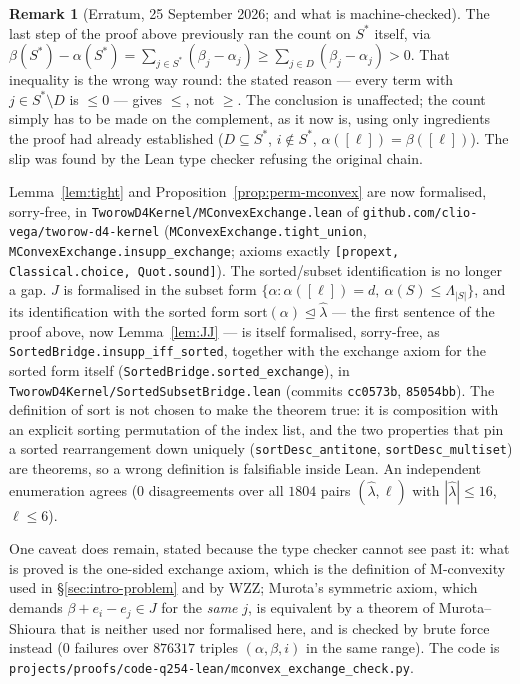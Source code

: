 \documentclass[11pt]{article}
\theoremstyle{plain}
\theoremstyle{definition}
\newtheorem{rem}[thm]{Remark}
\begin{document}
\begin{rem}[Erratum, 25 September 2026; and what is machine-checked]\label{rem:mconvex-erratum}
The last step of the proof above previously ran the count on $S^{*}$ itself, via
$\beta(S^{*})-\alpha(S^{*})=\sum_{j\in S^{*}}(\beta_j-\alpha_j)\ge\sum_{j\in D}(\beta_j-\alpha_j)>0$.
That inequality is the wrong way round: the stated reason --- every term with $j\in
S^{*}\setminus D$ is $\le 0$ --- gives $\le$, not $\ge$. The conclusion is unaffected; the
count simply has to be made on the complement, as it now is, using only ingredients the proof
had already established ($D\subseteq S^{*}$, $i\notin S^{*}$, $\alpha([\ell])=\beta([\ell])$).
The slip was found by the Lean type checker refusing the original chain.

Lemma~\ref{lem:tight} and Proposition~\ref{prop:perm-mconvex} are now formalised, sorry-free,
in \texttt{TworowD4Kernel/MConvexExchange.lean} of
\texttt{github.com/clio-vega/tworow-d4-kernel}
(\texttt{MConvexExchange.tight\_union}, \texttt{MConvexExchange.insupp\_exchange}; axioms
exactly \texttt{[propext, Classical.choice, Quot.sound]}). The sorted/subset identification is no longer a gap.
$J$ is formalised in the subset form
$\{\alpha:\alpha([\ell])=d,\ \alpha(S)\le\Lambda_{|S|}\}$, and its identification with the sorted
form $\mathrm{sort}(\alpha)\trianglelefteq\hat\lambda$ --- the first sentence of the proof above,
now Lemma~\ref{lem:JJ} --- is itself formalised, sorry-free, as
\texttt{SortedBridge.insupp\_iff\_sorted}, together with the exchange axiom for the sorted form
itself (\texttt{SortedBridge.sorted\_exchange}), in
\texttt{TworowD4Kernel/SortedSubsetBridge.lean} (commits \texttt{cc0573b}, \texttt{85054bb}).
The definition of $\mathrm{sort}$ is not chosen to make the theorem true: it is composition with
an explicit sorting permutation of the index list, and the two properties that pin a sorted
rearrangement down uniquely (\texttt{sortDesc\_antitone}, \texttt{sortDesc\_multiset}) are
theorems, so a wrong definition is falsifiable inside Lean. An independent enumeration agrees
($0$ disagreements over all $1804$ pairs $(\hat\lambda,\ell)$ with $|\hat\lambda|\le 16$,
$\ell\le 6$).

One caveat does remain, stated because the type checker cannot see past it:
what is proved is the one-sided exchange axiom, which is the definition of
M-convexity used in \S\ref{sec:intro-problem} and by WZZ; Murota's symmetric axiom, which
demands $\beta+e_i-e_j\in J$ for the \emph{same} $j$, is equivalent by a theorem of
Murota--Shioura that is neither used nor formalised here, and is checked by brute force
instead ($0$ failures over $876317$ triples $(\alpha,\beta,i)$ in the same range). The code is
\texttt{projects/proofs/code-q254-lean/mconvex\_exchange\_check.py}.
\end{rem}
\end{document}
